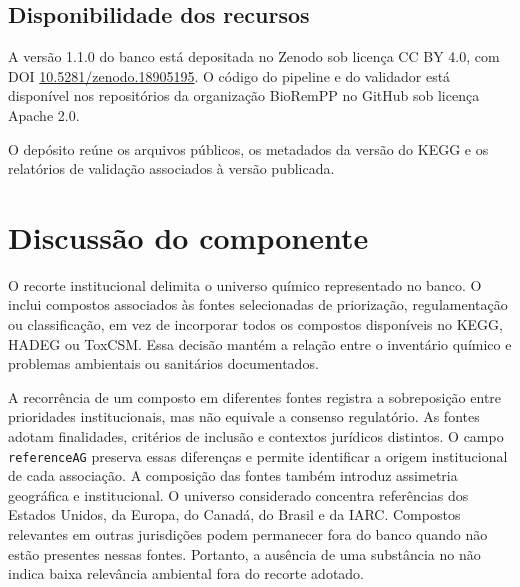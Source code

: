 \subsection{Disponibilidade dos recursos}

A versão 1.1.0 do banco está depositada no Zenodo sob licença CC BY 4.0,
com DOI
\href{https://doi.org/10.5281/zenodo.18905195}
{10.5281/zenodo.18905195}. O código do pipeline e do validador está
disponível nos repositórios da organização BioRemPP no GitHub sob licença
Apache 2.0.

O depósito reúne os arquivos públicos, os metadados da versão do KEGG e os
relatórios de validação associados à versão publicada.

\section{Discussão do componente}
\label{sec:c1-discussao}

O recorte institucional delimita o universo químico representado no banco. O
\biorempp{} inclui compostos associados às fontes selecionadas de
priorização, regulamentação ou classificação, em vez de incorporar todos os
compostos disponíveis no KEGG, HADEG ou ToxCSM. Essa decisão mantém a relação
entre o inventário químico e problemas ambientais ou sanitários documentados.

A recorrência de um composto em diferentes fontes registra a sobreposição
entre prioridades institucionais, mas não equivale a consenso regulatório.
As fontes adotam finalidades, critérios de inclusão e contextos jurídicos
distintos. O campo \texttt{referenceAG} preserva essas diferenças e permite
identificar a origem institucional de cada associação. A composição das fontes também introduz assimetria geográfica e institucional.
O universo considerado concentra referências dos Estados Unidos, da Europa,
do Canadá, do Brasil e da IARC. Compostos relevantes em outras jurisdições
podem permanecer fora do banco quando não estão presentes nessas fontes.
Portanto, a ausência de uma substância no \biorempp{} não indica baixa
relevância ambiental fora do recorte adotado.

